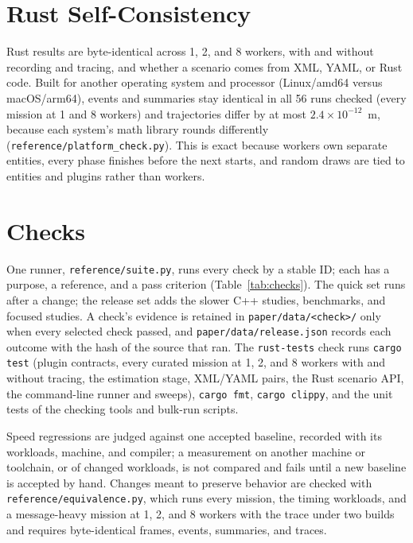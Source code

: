 \documentclass[conference]{IEEEtran}
\begin{document}
\section{Rust Self-Consistency}
\label{app:self}

Rust results are byte-identical across 1, 2, and 8 workers, with and without
recording and tracing, and whether a scenario comes from XML, YAML, or Rust
code. Built for another operating system and processor (Linux/amd64 versus
macOS/arm64), events and summaries stay identical in all 56 runs checked (every
mission at 1 and 8 workers) and trajectories differ by at most
$2.4\times10^{-12}$~m, because each system's math
library rounds differently (\texttt{reference/platform\_check.py}). This is
exact because workers own separate entities, every phase finishes
before the next starts, and random draws are tied to entities and plugins
rather than workers.

\section{Checks}
\label{app:suites}
\label{app:refactors}

One runner, \texttt{reference/suite.py}, runs every check by a stable ID; each
has a purpose, a reference, and a pass criterion (Table~\ref{tab:checks}).
The quick set runs after a change; the release set adds the slower C++
studies, benchmarks, and focused studies. A check's evidence is retained in
\texttt{paper/data/<check>/} only when every selected check passed, and
\texttt{paper/data/release.json} records each outcome with the hash of the
source that ran. The \texttt{rust-tests} check runs \texttt{cargo test} (plugin
contracts, every curated mission at 1, 2, and 8 workers with and without
tracing, the estimation stage, XML/YAML pairs, the Rust scenario API, the
command-line runner and sweeps), \texttt{cargo fmt}, \texttt{cargo clippy},
and the unit tests of the checking tools and bulk-run scripts.

Speed regressions are judged against one accepted baseline, recorded with its
workloads, machine, and compiler; a measurement on another machine or
toolchain, or of changed workloads, is not compared and fails until a new
baseline is accepted by hand. Changes meant to preserve behavior are checked
with \texttt{reference/equivalence.py}, which runs every mission, the timing
workloads, and a message-heavy mission at 1, 2, and 8 workers with the trace
under two builds and requires byte-identical frames, events, summaries, and
traces.
\end{document}
